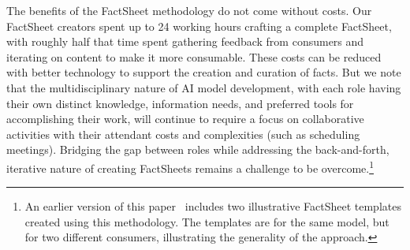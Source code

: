 \documentclass[11pt,dvipdfm]{article}
\begin{document}
The benefits of the FactSheet methodology do not come without costs. Our FactSheet creators spent up to 24 working hours crafting a complete FactSheet, with roughly half that time spent gathering feedback from consumers and iterating on content to make it more consumable. These costs can be reduced with better technology to support the creation and curation of facts. But we note that the multidisciplinary nature of AI model development, with each role having their own distinct knowledge, information needs, and preferred tools for accomplishing their work, will continue to require a focus on collaborative activities with their attendant costs and complexities (such as scheduling meetings). Bridging the gap between roles while addressing the back-and-forth, iterative nature of creating FactSheets remains a challenge to be overcome.\footnote{An earlier version of this paper~\cite{FactSheets-Methodology-arxiv-2020}
includes two illustrative FactSheet templates created using this methodology.  The templates are for the same model, but for two different consumers, illustrating the generality of the approach.}


\vspace{-.1cm}
%

% 
% 
\end{document}
